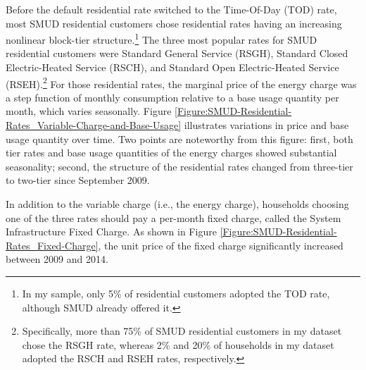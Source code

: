 Before the default residential rate switched to the Time-Of-Day (TOD) rate, most SMUD residential customers chose residential rates having an increasing nonlinear block-tier structure.\footnote{In my sample, only 5\% of residential customers adopted the TOD rate, although SMUD already offered it.} The three most popular rates for SMUD residential customers were Standard General Service (RSGH), Standard Closed Electric-Heated Service (RSCH), and Standard Open Electric-Heated Service (RSEH).\footnote{Specifically, more than 75\% of SMUD residential customers in my dataset chose the RSGH rate, whereas 2\% and 20\% of households in my dataset adopted the RSCH and RSEH rates, respectively.} For those residential rates, the marginal price of the energy charge was a step function of monthly consumption relative to a base usage quantity per month, which varies seasonally. Figure \ref{Figure:SMUD-Residential-Rates_Variable-Charge-and-Base-Usage} illustrates variations in price and base usage quantity over time. Two points are noteworthy from this figure: first, both tier rates and base usage quantities of the energy charges showed substantial seasonality; second, the structure of the residential rates changed from three-tier to two-tier since September 2009.

In addition to the variable charge (i.e., the energy charge), households choosing one of the three rates should pay a per-month fixed charge, called the System Infrastructure Fixed Charge. As shown in Figure \ref{Figure:SMUD-Residential-Rates_Fixed-Charge}, the unit price of the fixed charge significantly increased between 2009 and 2014. 
